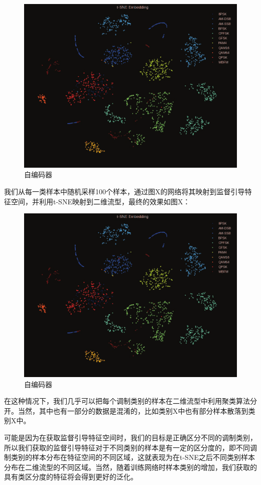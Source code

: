 \begin{figure}[!h]
	\centering
	\includegraphics[scale=0.2]{figures/chapter_3/surprised_fea}
	\caption{自编码器}	\label{fig_3_6}
\end{figure}

我们从每一类样本中随机采样100个样本，通过图X的网络将其映射到监督引导特征空间，并利用t-SNE映射到二维流型，最终的效果如图X：

\begin{figure}[!h]
	\centering
	\includegraphics[scale=0.2]{figures/chapter_3/surprised_fea}
	\caption{自编码器}
\end{figure}

在这种情况下，我们几乎可以把每个调制类别的样本在二维流型中利用聚类算法分开。当然，其中也有一部分的数据是混淆的，比如类别X中也有部分样本散落到类别X中。\par
可能是因为在获取监督引导特征空间时，我们的目标是正确区分不同的调制类别，所以我们获取的监督引导特征对于不同类别的样本是有一定的区分度的，即不同调制类别的样本分布在特征空间的不同区域，这就表现为在t-SNE之后不同类别样本分布在二维流型的不同区域。当然，随着训练网络时样本类别的增加，我们获取的具有类区分度的特征将会得到更好的泛化。\par



